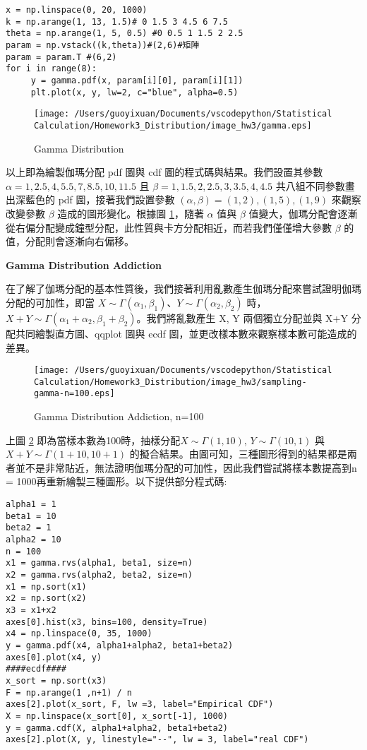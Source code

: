 \bigskip
\begin{lstlisting}
x = np.linspace(0, 20, 1000)
k = np.arange(1, 13, 1.5)# 0 1.5 3 4.5 6 7.5
theta = np.arange(1, 5, 0.5) #0 0.5 1 1.5 2 2.5
param = np.vstack((k,theta))#(2,6)#矩陣
param = param.T #(6,2)
for i in range(8):
     y = gamma.pdf(x, param[i][0], param[i][1])
     plt.plot(x, y, lw=2, c="blue", alpha=0.5)
\end{lstlisting}

\begin{figure}[H]
    \centering
        \texttt{[image: /Users/guoyixuan/Documents/vscodepython/Statistical Calculation/Homework3\_Distribution/image\_hw3/gamma.eps]}
    \caption{Gamma Distribution}
    \label{Gamma Distribution}
\end{figure}

以上即為繪製伽瑪分配 pdf 圖與 cdf 圖的程式碼與結果。我們設置其參數 $\alpha=1,2.5,4,5.5,7,8.5,10,11.5$ 且 $\beta=1,1.5,2,2.5,3,3.5,4,4.5$ 共八組不同參數畫出深藍色的 pdf 圖，接著我們設置參數 $(\alpha,\beta)=(1,2),(1,5),(1,9)$ 來觀察改變參數 $\beta$ 造成的圖形變化。根據圖 \ref{Gamma Distribution}，隨著 $\alpha$ 值與 $\beta$ 值變大，伽瑪分配會逐漸從右偏分配變成鐘型分配，此性質與卡方分配相近，而若我們僅僅增大參數 $\beta$ 的值，分配則會逐漸向右偏移。

\textbf{Gamma Distribution Addiction}

在了解了伽瑪分配的基本性質後，我們接著利用亂數產生伽瑪分配來嘗試證明伽瑪分配的可加性，即當 $X \sim \Gamma(\alpha_1,\beta_1)$、$Y \sim \Gamma(\alpha_2,\beta_2)$ 時，$X+Y \sim \Gamma(\alpha_1+\alpha_2,\beta_1+\beta_2)$。我們將亂數產生 X, Y 兩個獨立分配並與 X+Y 分配共同繪製直方圖、qqplot 圖與 ecdf 圖，並更改樣本數來觀察樣本數可能造成的差異。

\begin{figure}[H]
    \centering
        \texttt{[image: /Users/guoyixuan/Documents/vscodepython/Statistical Calculation/Homework3\_Distribution/image\_hw3/sampling-gamma-n=100.eps]}
    \caption{Gamma Distribution Addiction, n=100}
    \label{sampling-gamma-n=100}
\end{figure}

上圖 \ref{sampling-gamma-n=100} 即為當樣本數為100時，抽樣分配$X \sim \Gamma(1,10)$, $Y \sim \Gamma(10,1)$ 與 $X+Y \sim \Gamma(1+10,10+1)$ 的擬合結果。由圖可知，三種圖形得到的結果都是兩者並不是非常貼近，無法證明伽瑪分配的可加性，因此我們嘗試將樣本數提高到n = 1000再重新繪製三種圖形。以下提供部分程式碼:

\bigskip
\begin{lstlisting}
alpha1 = 1
beta1 = 10
beta2 = 1
alpha2 = 10
n = 100
x1 = gamma.rvs(alpha1, beta1, size=n)
x2 = gamma.rvs(alpha2, beta2, size=n)
x1 = np.sort(x1)
x2 = np.sort(x2)
x3 = x1+x2
axes[0].hist(x3, bins=100, density=True)
x4 = np.linspace(0, 35, 1000)
y = gamma.pdf(x4, alpha1+alpha2, beta1+beta2)
axes[0].plot(x4, y)
####ecdf####
x_sort = np.sort(x3)
F = np.arange(1 ,n+1) / n 
axes[2].plot(x_sort, F, lw =3, label="Empirical CDF")
X = np.linspace(x_sort[0], x_sort[-1], 1000)
y = gamma.cdf(X, alpha1+alpha2, beta1+beta2)
axes[2].plot(X, y, linestyle="--", lw = 3, label="real CDF")
\end{lstlisting}

